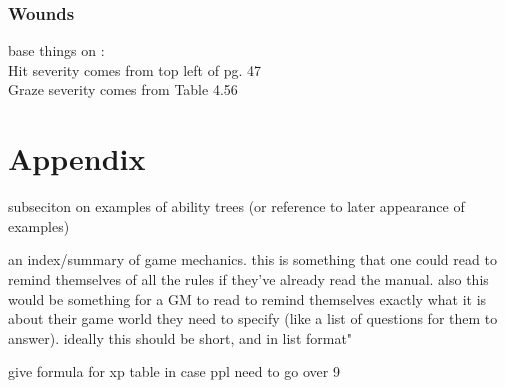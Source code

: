 \documentclass[12pt]{article}
\newcommand{\notes}[1]{{\color{Tan} #1}}
\begin{document}
\subsubsection{Wounds}\label{sec:wounds}

\notes{base things on :\\
			Hit severity comes from top left of pg. 47\\
			Graze severity comes from Table 4.56
}

\section{Appendix}


\notes{subseciton on examples of ability trees (or reference to later appearance of examples)}

\notes{an index/summary of game mechanics. this is something that one could read to remind themselves of all the rules
if they've already read the manual. also this would be something for a GM to read to remind themselves
exactly what it is about their game world they need to specify (like a list of questions for them to answer).
ideally this should be short, and in list format"}


\notes{give formula for xp table in case ppl need to go over 9}

\printindex
\end{document}
